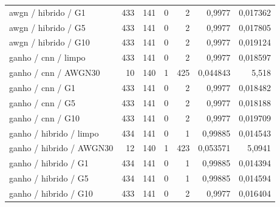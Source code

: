 \begin{longtable}{@{}p{.38\linewidth}rrrrrr@{}}
awgn /\allowbreak{} hibrido /\allowbreak{} G1 & 433 & 141 & 0 & 2 & 0,9977 & 0,017362\\
awgn /\allowbreak{} hibrido /\allowbreak{} G5 & 433 & 141 & 0 & 2 & 0,9977 & 0,017805\\
awgn /\allowbreak{} hibrido /\allowbreak{} G10 & 433 & 141 & 0 & 2 & 0,9977 & 0,019124\\
ganho /\allowbreak{} cnn /\allowbreak{} limpo & 433 & 141 & 0 & 2 & 0,9977 & 0,018597\\
ganho /\allowbreak{} cnn /\allowbreak{} AWGN30 & 10 & 140 & 1 & 425 & 0,044843 & 5,518\\
ganho /\allowbreak{} cnn /\allowbreak{} G1 & 433 & 141 & 0 & 2 & 0,9977 & 0,018482\\
ganho /\allowbreak{} cnn /\allowbreak{} G5 & 433 & 141 & 0 & 2 & 0,9977 & 0,018188\\
ganho /\allowbreak{} cnn /\allowbreak{} G10 & 433 & 141 & 0 & 2 & 0,9977 & 0,019709\\
ganho /\allowbreak{} hibrido /\allowbreak{} limpo & 434 & 141 & 0 & 1 & 0,99885 & 0,014543\\
ganho /\allowbreak{} hibrido /\allowbreak{} AWGN30 & 12 & 140 & 1 & 423 & 0,053571 & 5,0941\\
ganho /\allowbreak{} hibrido /\allowbreak{} G1 & 434 & 141 & 0 & 1 & 0,99885 & 0,014394\\
ganho /\allowbreak{} hibrido /\allowbreak{} G5 & 434 & 141 & 0 & 1 & 0,99885 & 0,014594\\
ganho /\allowbreak{} hibrido /\allowbreak{} G10 & 433 & 141 & 0 & 2 & 0,9977 & 0,016404\\
\bottomrule\end{longtable}\normalsize

